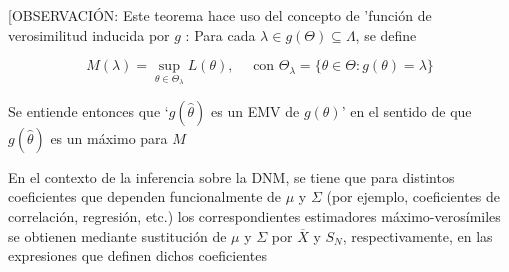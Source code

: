 \documentclass[11pt,a4paper]{article}
\begin{document}
[OBSERVACIÓN: Este teorema hace uso del concepto de 'función de verosimilitud inducida por $g$ : Para cada $\lambda \in g(\Theta) \subseteq \Lambda$, se define

$$M(\lambda)=\sup\limits_{\theta \in \Theta_{\lambda}} L(\theta), \quad \text{ con } \Theta_{\lambda}=\{\theta \in \Theta: g(\theta)=\lambda\}$$

Se entiende entonces que `$g(\hat{\theta})$ es un EMV de $g(\theta)$' en el sentido de que $g(\hat{\theta})$ es un máximo para $M$

En el contexto de la inferencia sobre la DNM, se tiene que para distintos coeficientes que dependen funcionalmente de $\mu$ y $\Sigma$ (por ejemplo, coeficientes de correlación, regresión, etc.) los correspondientes estimadores máximo-verosímiles se obtienen mediante sustitución de $\mu$ y $\Sigma$ por $\overline{X}$ y $S_{N}$, respectivamente, en las expresiones que definen dichos coeficientes
\end{document}
